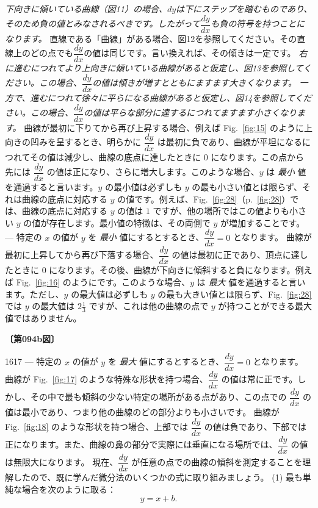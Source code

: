 \documentclass[a4paper,11pt,openany]{ltjsbook}
\newcommand{\Pageref}[2][p.]{#1~\ref{#2}}
\newcommand{\Fig}[1]{Fig.~\ref{fig:#1}}
\begin{document}
\textit{下向きに傾いている曲線（図11）の場合、$dy$は下にステップを踏むものであり、そのため負の値とみなされるべきです。したがって$\dfrac{dy}{dx}$も負の符号を持つことになります。}
直線である「曲線」がある場合、図12を参照してください。その直線上のどの点でも$\dfrac{dy}{dx}$の値は同じです。言い換えれば、その傾きは一定です。
\textit{右に進むにつれてより上向きに傾いている曲線があると仮定し、図13を参照してください。この場合、$\dfrac{dy}{dx}$の値は傾きが増すとともにますます大きくなります。}
\textit{一方で、進むにつれて徐々に平らになる曲線があると仮定し、図14を参照してください。この場合、$\dfrac{dy}{dx}$の値は平らな部分に達するにつれてますます小さくなります。}
曲線が最初に下りてから再び上昇する場合、例えば \Fig{15} のように上向きの凹みを呈するとき、明らかに $\dfrac{dy}{dx}$ は最初に負であり、曲線が平坦になるにつれてその値は減少し、曲線の底点に達したときに $0$ になります。この点から先には $\dfrac{dy}{dx}$ の値は正になり、さらに増大します。このような場合、$y$ は \emph{最小} 値を通過すると言います。$y$ の最小値は必ずしも $y$ の最も小さい値とは限らず、それは曲線の底点に対応する $y$ の値です。例えば、\Fig{28}（\Pageref{fig:28}）では、曲線の底点に対応する $y$ の値は $1$ ですが、他の場所ではこの値よりも小さい $y$ の値が存在します。最小値の特徴は、その両側で $y$ が増加することです。
--- 特定の $x$ の値が $y$ を \emph{最小} 値にするとするとき、$\dfrac{dy}{dx}=0$ となります。
曲線が最初に上昇してから再び下落する場合、$\dfrac{dy}{dx}$ の値は最初に正であり、頂点に達したときに $0$ になります。その後、曲線が下向きに傾斜すると負になります。例えば \Fig{16} のようにです。このような場合、$y$ は \emph{最大} 値を通過すると言います。ただし、$y$ の最大値は必ずしも $y$ の最も大きい値とは限らず、\Fig{28} では $y$ の最大値は $2\frac{1}{3}$ ですが、これは他の曲線の点で $y$ が持つことができる最大値ではありません。
\par\textbf{〔第094b図〕}\par{16}{17}
--- 特定の $x$ の値が $y$ を \emph{最大} 値にするとするとき、$\dfrac{dy}{dx}=0$ となります。
曲線が \Fig{17} のような特殊な形状を持つ場合、$\dfrac{dy}{dx}$ の値は常に正です。しかし、その中で最も傾斜の少ない特定の場所がある点があり、この点での $\dfrac{dy}{dx}$ の値は最小であり、つまり他の曲線のどの部分よりも小さいです。
曲線が \Fig{18} のような形状を持つ場合、上部では $\dfrac{dy}{dx}$ の値は負であり、下部では正になります。また、曲線の鼻の部分で実際には垂直になる場所では、$\dfrac{dy}{dx}$ の値は無限大になります。
現在、$\dfrac{dy}{dx}$ が任意の点での曲線の傾斜を測定することを理解したので、既に学んだ微分法のいくつかの式に取り組みましょう。
(1) 最も単純な場合を次のように取る：
\[
y = x + b.
\]
\end{document}
